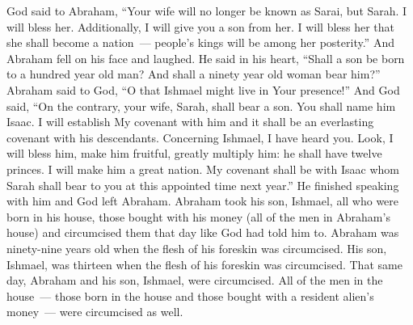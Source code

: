 \begin{inparaenum}
     God said to Abraham, ``Your wife will no longer be known as Sarai, but Sarah.%
     I will bless her. Additionally, I will give you a son from her. I will bless her that she shall become a nation~--- people's kings will be among her posterity.''%
     And Abraham fell on his face and laughed. He said in his heart, ``Shall a son be born to a hundred year old man? And shall a ninety year old woman bear him?''%
     Abraham said to God, ``O that Ishmael might live in Your presence!''%
     And God said, ``On the contrary, your wife, Sarah, shall bear a son. You shall name him Isaac. I will establish My covenant with him and it shall be an everlasting covenant with his descendants.%
     Concerning Ishmael, I have heard you. Look, I will bless him, make him fruitful, greatly multiply him: he shall have twelve princes. I will make him a great nation.%
     My covenant shall be with Isaac whom Sarah shall bear to you at this appointed time next year.''%
     He finished speaking with him and God left Abraham.%
     Abraham took his son, Ishmael, all who were born in his house, those bought with his money (all of the men in Abraham's house) and circumcised them that day like God had told him to.%
     Abraham was ninety-nine years old when the flesh of his foreskin was circumcised.%
     His son, Ishmael, was thirteen when the flesh of his foreskin was circumcised.%
     That same day, Abraham and his son, Ishmael, were circumcised.%
     All of the men in the house~--- those born in the house and those bought with a resident alien's money~--- were circumcised as well.%
\end{inparaenum}
